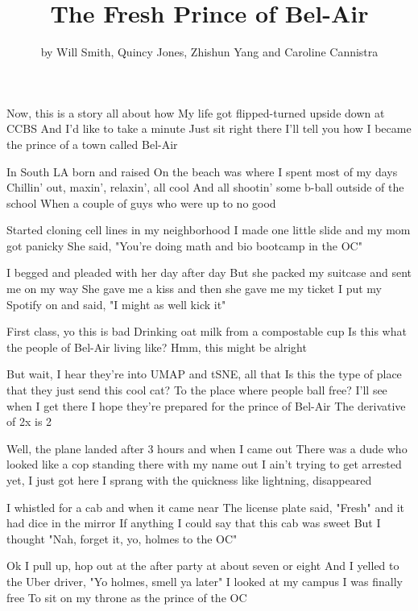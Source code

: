 \documentclass{article}
\title{The Fresh Prince of Bel-Air}
\author{by Will Smith, Quincy Jones, Zhishun Yang and Caroline Cannistra}
\begin{document}
\maketitle

Now, this is a story all about how
My life got flipped-turned upside down
at CCBS
And I'd like to take a minute
Just sit right there
I'll tell you how I became the prince of a town called Bel-Air

In South LA born and raised
On the beach was where I spent most of my days
Chillin' out, maxin', relaxin', all cool
And all shootin' some b-ball outside of the school
When a couple of guys who were up to no good

Started cloning cell lines in my neighborhood
I made one little slide and my mom got panicky
She said, "You're doing math and bio bootcamp in the OC"

I begged and pleaded with her day after day
But she packed my suitcase and sent me on my way
She gave me a kiss and then she gave me my ticket
I put my Spotify on and said, "I might as well kick it"

First class, yo this is bad
Drinking oat milk from a compostable cup
Is this what the people of Bel-Air living like?
Hmm, this might be alright

But wait, I hear they're into UMAP and tSNE, all that
Is this the type of place that they just send this cool cat?
To the place where people ball free?
I'll see when I get there
I hope they're prepared for the prince of Bel-Air
The derivative of 2x is 2

Well, the plane landed after 3 hours and when I came out
There was a dude who looked like a cop standing there with my name out
I ain't trying to get arrested yet, I just got here
I sprang with the quickness like lightning, disappeared

I whistled for a cab and when it came near
The license plate said, "Fresh" and it had dice in the mirror
If anything I could say that this cab was sweet
But I thought "Nah, forget it, yo, holmes to the OC"

Ok I pull up, hop out at the after party at about seven or eight
And I yelled to the Uber driver, "Yo holmes, smell ya later"
I looked at my campus
I was finally free
To sit on my throne as the prince of the OC
\end{document}
